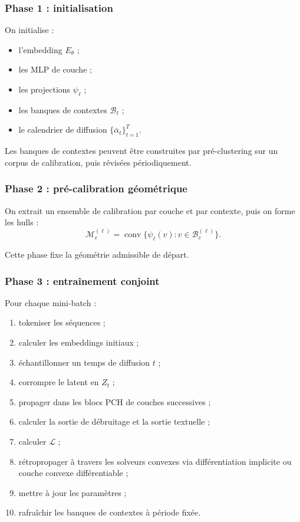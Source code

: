 \documentclass[11pt]{article}
\begin{document}
\subsubsection{Phase 1 : initialisation}

On initialise :
\begin{itemize}[leftmargin=2em]
    \item l'embedding \(E_\theta\) ;
    \item les MLP de couche ;
    \item les projections \(\psi_\ell\) ;
    \item les banques de contextes \(\mathcal B_\ell\) ;
    \item le calendrier de diffusion \(\{\bar\alpha_t\}_{t=1}^T\).
\end{itemize}

Les banques de contextes peuvent être construites par pré-clustering sur un corpus de calibration, puis révisées périodiquement.

\subsubsection{Phase 2 : pré-calibration géométrique}

On extrait un ensemble de calibration par couche et par contexte, puis on forme les hulls :
\[
\mathcal M_c^{(\ell)}
=
\operatorname{conv}\{\psi_\ell(v):v\in\mathcal B_c^{(\ell)}\}.
\]

Cette phase fixe la géométrie admissible de départ.

\subsubsection{Phase 3 : entraînement conjoint}

Pour chaque mini-batch :
\begin{enumerate}[leftmargin=2em]
    \item tokeniser les séquences ;
    \item calculer les embeddings initiaux ;
    \item échantillonner un temps de diffusion \(t\) ;
    \item corrompre le latent en \(Z_t\) ;
    \item propager dans les blocs PCH de couches successives ;
    \item calculer la sortie de débruitage et la sortie textuelle ;
    \item calculer \(\mathcal L\) ;
    \item rétropropager à travers les solveurs convexes via différentiation implicite ou couche convexe différentiable ;
    \item mettre à jour les paramètres ;
    \item rafraîchir les banques de contextes à période fixée.
\end{enumerate}
\end{document}
